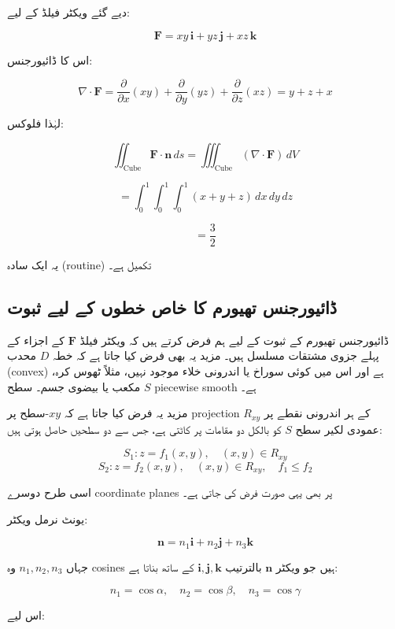 \begin{enumerate}
\bigskip

دیے گئے ویکٹر فیلڈ کے لیے:

\[
\mathbf{F} = xy\,\mathbf{i} + yz\,\mathbf{j} + xz\,\mathbf{k}
\]

اس کا ڈائیورجنس:

\[
\nabla \cdot \mathbf{F}
=
\frac{\partial}{\partial x}(xy)
+
\frac{\partial}{\partial y}(yz)
+
\frac{\partial}{\partial z}(xz)
=
y + z + x
\]

\bigskip

لہٰذا فلوکس:

\[
\iint_{\text{Cube}} \mathbf{F}\cdot \mathbf{n}\, ds
=
\iiint_{\text{Cube}} (\nabla \cdot \mathbf{F})\, dV
\]

\[
=
\int_0^1 \int_0^1 \int_0^1 (x + y + z)\, dx\, dy\, dz
\]

\[
=
\frac{3}{2}
\]

یہ ایک سادہ (routine) تکمیل ہے۔

\bigskip

\subsection*{ڈائیورجنس تھیورم کا خاص خطوں کے لیے ثبوت}

ڈائیورجنس تھیورم کے ثبوت کے لیے ہم فرض کرتے ہیں کہ ویکٹر فیلڈ \( \mathbf{F} \) کے اجزاء کے پہلے جزوی مشتقات مسلسل ہیں۔ مزید یہ بھی فرض کیا جاتا ہے کہ خطہ \( D \) محدب (convex) ہے اور اس میں کوئی سوراخ یا اندرونی خلاء موجود نہیں، مثلاً ٹھوس کرہ، مکعب یا بیضوی جسم۔ سطح \( S \) piecewise smooth ہے۔

مزید یہ فرض کیا جاتا ہے کہ \( xy \)-سطح پر projection \( R_{xy} \) کے ہر اندرونی نقطے پر عمودی لکیر سطح \( S \) کو بالکل دو مقامات پر کاٹتی ہے، جس سے دو سطحیں حاصل ہوتی ہیں:

\[
S_1: z = f_1(x,y), \quad (x,y)\in R_{xy}
\]
\[
S_2: z = f_2(x,y), \quad (x,y)\in R_{xy}, \quad f_1 \le f_2
\]

اسی طرح دوسرے coordinate planes پر بھی یہی صورت فرض کی جاتی ہے۔

\bigskip

یونٹ نرمل ویکٹر:

\[
\mathbf{n} = n_1\mathbf{i} + n_2\mathbf{j} + n_3\mathbf{k}
\]

جہاں \( n_1, n_2, n_3 \) وہ cosines ہیں جو ویکٹر \( \mathbf{n} \) بالترتیب \( \mathbf{i}, \mathbf{j}, \mathbf{k} \) کے ساتھ بناتا ہے:

\[
n_1 = \cos \alpha,\quad n_2 = \cos \beta,\quad n_3 = \cos \gamma
\]

اس لیے:


\end{enumerate}
